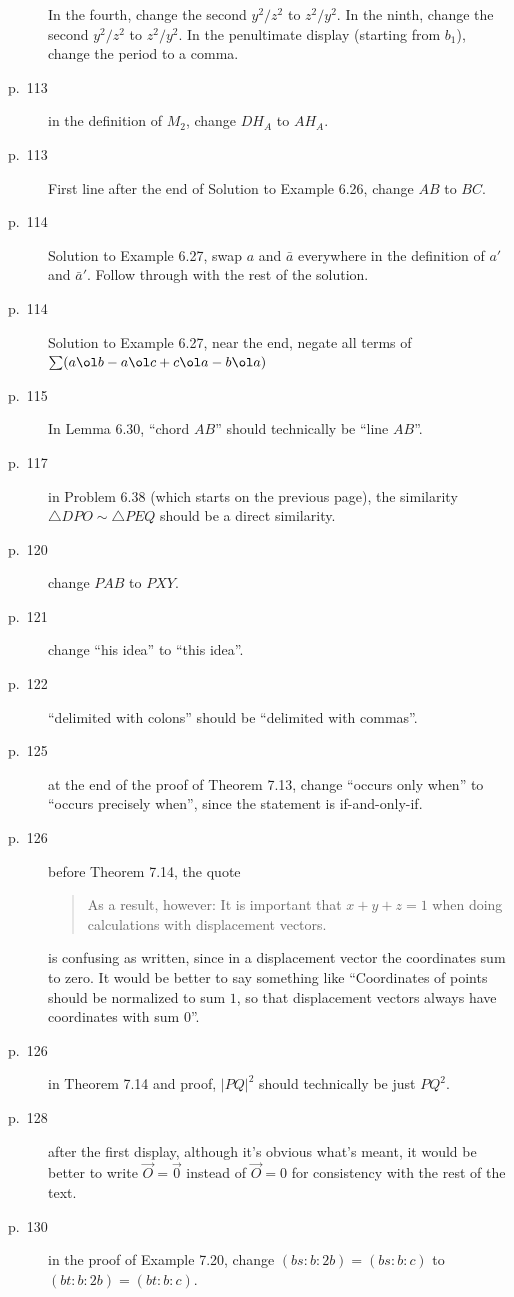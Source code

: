 \documentclass[11pt]{scrartcl}
\begin{document}
\begin{description}
  In the fourth, change the second $y^2/z^2$ to $z^2/y^2$.
  In the ninth, change the second $y^2/z^2$ to $z^2/y^2$.
  In the penultimate display (starting from $b_1$), change the period to a comma.
\item[p.\  113] in the definition of $M_2$, change $DH_A$ to $AH_A$.
\item[p.\  113] First line after the end of Solution to Example 6.26,  change $AB$ to $BC$.
\item[p.\  114] Solution to Example 6.27, swap $a$ and $\bar a$ everywhere
  in the definition of $a'$ and $\bar a'$.
  Follow through with the rest of the solution.
\item[p.\  114] Solution to Example 6.27, near the end, negate all terms of
  $\sum (a \ol b - a \ol c + c \ol a - b \ol a)$
\item[p.\  115] In Lemma 6.30, ``chord $AB$'' should technically be ``line $AB$''.
\item[p.\  117] in Problem 6.38 (which starts on the previous page), the similarity
  $\triangle DPO \sim \triangle PEQ$ should be a direct similarity.
\item[p.\  120] change $PAB$ to $PXY$.
\item[p.\  121] change ``his idea'' to ``this idea''.
\item[p.\  122] ``delimited with colons'' should be ``delimited with commas''.
\item[p.\  125] at the end of the proof of Theorem 7.13,
  change ``occurs only when'' to ``occurs precisely when'',
  since the statement is if-and-only-if.
\item[p.\  126] before Theorem 7.14, the quote
  \begin{quote}
    As a result, however:
    It is important that $x+y+z=1$ when doing calculations with displacement vectors.
  \end{quote}
  is confusing as written, since in a displacement vector the coordinates sum to zero.
  It would be better to say something like
  ``Coordinates of points should be normalized to sum $1$,
  so that displacement vectors always have coordinates with sum $0$''.
\item[p.\  126] in Theorem 7.14 and proof, $|PQ|^2$ should technically be just $PQ^2$.
\item[p.\  128] after the first display,
  although it's obvious what's meant, it would be better to write $\vec O = \vec 0$
  instead of $\vec O = 0$ for consistency with the rest of the text.
\item[p.\  130] in the proof of Example 7.20, change $(bs:b:2b)=(bs:b:c)$ to $(bt:b:2b)=(bt:b:c)$.

\end{description}
\end{document}
